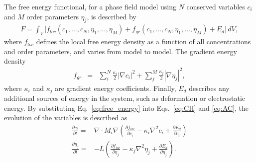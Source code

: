 \documentclass[letter,12pt,fleqn]{article}
\begin{document}
The free energy functional, for a phase field model using $N$ conserved variables $c_i$ and $M$ order parameters $\eta_j$, is described by
\begin{eqnarray}
	F = \int_V \big[ f_{loc}(c_1, \ldots,c_N, \eta_1, \ldots, \eta_M) + f_{gr}(c_1, \ldots,c_N, \eta_1,  \ldots, \eta_M) + E_{d} \big] \, dV,
\end{eqnarray}
where $f_{loc}$ defines the local free energy density as a function of all concentrations and order parameters, and varies from model to model.  The gradient energy density
\begin{eqnarray}
	f_{gr} &=& \sum_i^N \frac{\kappa_i}{2} |\nabla c_i|^2 + \sum^M_j \frac{\kappa_j}{2} |\nabla \eta_j|^2,\label{eq:free_energy}
\end{eqnarray} 
where $\kappa_i$ and $\kappa_j$ are gradient energy coefficients.  Finally, $E_d$ describes any additional sources of energy in the system, such as deformation or electrostatic energy.  By substituting Eq.~\eqref{eq:free_energy} into Eqs.~\eqref{eq:CH} and \eqref{eq:AC}, the evolution of the variables is described as
\begin{eqnarray}
	\frac{\partial c_i}{\partial t} = &\nabla \cdot M_i \nabla \left( \frac{\partial f_{loc}}{\partial c_i} - \kappa_i \nabla^2 c_i + \frac{\partial E_{d}}{\partial c_i} \right) \label{eq:cons_residual_strong}\\
	\frac{\partial \eta_j}{\partial t} = & - L \left( \frac{\partial f_{loc}}{\partial \eta_j} - \kappa_j \nabla^2 \eta_j +  \frac{\partial E_{d}}{\partial \eta_j} \right).  \label{eq:op_residual_strong}
\end{eqnarray}
\end{document}
